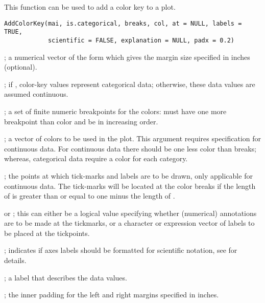 \documentclass[a4paper]{book}
\begin{document}
%
\begin{Description}\relax
This function can be used to add a color key to a plot.
\end{Description}
%
\begin{Usage}
\begin{verbatim}
AddColorKey(mai, is.categorical, breaks, col, at = NULL, labels = TRUE,
            scientific = FALSE, explanation = NULL, padx = 0.2)
\end{verbatim}
\end{Usage}
%
\begin{Arguments}
\begin{ldescription}
\item[\code{mai}] ; a numerical vector of the form  which gives the margin size specified in inches (optional).
\item[\code{is.categorical}] ; if , color-key values represent categorical data; otherwise, these data values are assumed continuous.
\item[\code{breaks}] ; a set of finite numeric breakpoints for the colors: must have one more breakpoint than color and be in increasing order.
\item[\code{col}] ; a vector of colors to be used in the plot.
This argument requires  specification for continuous data.
For continuous data there should be one less color than breaks; whereas, categorical data require a color for each category.
\item[\code{at}] ; the points at which tick-marks and labels are to be drawn, only applicable for continuous data.
The tick-marks will be located at the color breaks if the length of  is greater than or equal to one minus the length of .
\item[\code{labels}]  or ; this can either be a logical value specifying whether (numerical) annotations are to be made at the tickmarks, or a character or expression vector of labels to be placed at the tickpoints.
\item[\code{scientific}] ; indicates if axes labels should be formatted for scientific notation, see  for details.
\item[\code{explanation}] ; a label that describes the data values.
\item[\code{padx}] ; the inner padding for the left and right margins specified in inches.
\end{ldescription}
\end{Arguments}
\end{document}
